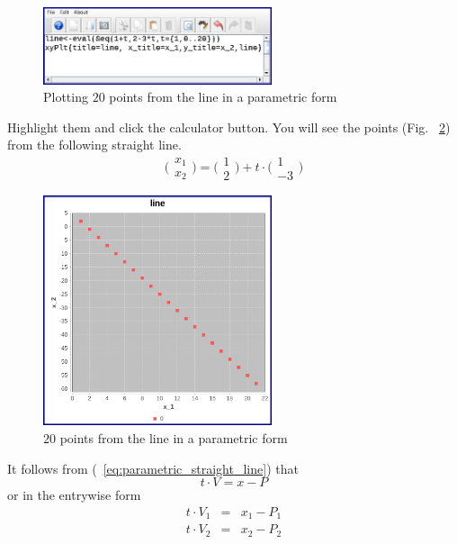 \documentclass[color=black,11pt]{elegantpaper}
\begin{document}
\begin{figure}[htbp]
  \centering
  \includegraphics[width=0.6\textwidth]{image/lineECandC.png}
  \caption{Plotting $20$ points from the line in a parametric form}
  \label{fig:lineECandC}
\end{figure}
Highlight them and click the calculator button. You will see the points  (Fig. ~\ref{fig:lineECandCPlot}) from the following straight line.
$$
\Big(\begin{array}{c}
x_1\\
x_2
\end{array}\Big) = \Big(\begin{array}{c}
                              1\\
                              2
                   \end{array}\Big) + t \cdot \Big(\begin{array}{c}
                                      1\\
                                     -3
                                       \end{array}\Big) 
$$
\begin{figure}[htbp]
  \centering
  \includegraphics[width=0.6\textwidth]{image/lineECandCPlot.png}
  \caption{$20$ points from the line in a parametric form}
  \label{fig:lineECandCPlot}
\end{figure}
It follows from (~\ref{eq:parametric_straight_line}) that
$$
t\cdot V = x- P
$$
or in the entrywise form
\begin{eqnarray*}
t \cdot V_1 &=& x_1 - P_1\\
t \cdot V_2 &=& x_2 - P_2
\end{eqnarray*}
\end{document}
